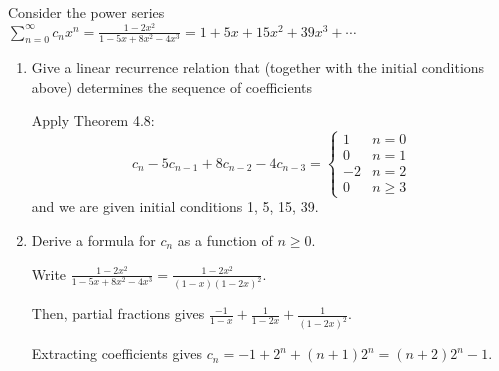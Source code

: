 \begin{xca}
  Consider the power series $\sum_{n=0}^\infty c_n x^n
    = \frac{1-2x^2}{1-5x+8x^2-4x^3}
    = 1 + 5x + 15x^2 + 39x^3 + \dotsb$
\end{xca}
\begin{enumerate}
  \item Give a linear recurrence relation that
        (together with the initial conditions above)
        determines the sequence of coefficients
        \begin{sol}
          Apply Theorem 4.8:
          \[
            c_n - 5c_{n-1} + 8c_{n-2} - 4c_{n-3} = \begin{cases}
              1  & n = 0    \\
              0  & n = 1    \\
              -2 & n = 2    \\
              0  & n \geq 3
            \end{cases}
          \]
          and we are given initial conditions 1, 5, 15, 39.
        \end{sol}
  \item Derive a formula for $c_n$ as a function of $n \geq 0$.
        \begin{sol}
          Write $\frac{1-2x^2}{1-5x+8x^2-4x^3} = \frac{1-2x^2}{(1-x)(1-2x)^2}$.

          Then, partial fractions gives $\frac{-1}{1-x} + \frac{1}{1-2x} + \frac{1}{(1-2x)^2}$.

          Extracting coefficients gives $c_n = -1 + 2^n + (n+1)2^n = (n+2)2^n - 1$.
        \end{sol}
\end{enumerate}
